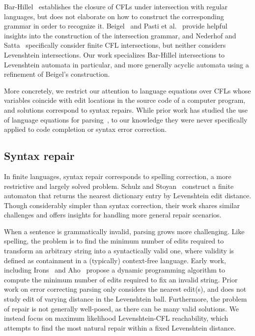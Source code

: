 \documentclass[runningheads]{llncs}
\begin{document}
  Bar-Hillel~\cite{bar1961formal} establishes the closure of CFLs under intersection with regular languages, but does not elaborate on how to construct the corresponding grammar in order to recognize it. Beigel~\cite{beigelproof} and Pasti et al.~\cite{pasti2023intersection} provide helpful insights into the construction of the intersection grammar, and Nederhof and Satta~\cite{nederhof2004language} specifically consider finite CFL intersections, but neither considers Levenshtein intersections. Our work specializes Bar-Hillel intersections to Levenshtein automata in particular, and more generally acyclic automata using a refinement of Beigel's construction.

  More concretely, we restrict our attention to language equations over CFLs whose variables coincide with edit locations in the source code of a computer program, and solutions correspond to syntax repairs. While prior work has studied the use of language equations for parsing~\cite{might2011parsing}, to our knowledge they were never specifically applied to code completion or syntax error correction.

  \subsection{Syntax repair}

  In finite languages, syntax repair corresponds to spelling correction, a more restrictive and largely solved problem. Schulz and Stoyan~\cite{schulz2002fast} construct a finite automaton that returns the nearest dictionary entry by Levenshtein edit distance. Though considerably simpler than syntax correction, their work shares similar challenges and offers insights for handling more general repair scenarios.

  When a sentence is grammatically invalid, parsing grows more challenging. Like spelling, the problem is to find the minimum number of edits required to transform an arbitrary string into a syntactically valid one, where validity is defined as containment in a (typically) context-free language. Early work, including Irons~\cite{irons1963error} and Aho~\cite{aho1972minimum} propose a dynamic programming algorithm to compute the minimum number of edits required to fix an invalid string. Prior work on error correcting parsing only considers the nearest edit(s), and does not study edit of varying distance in the Levenshtein ball. Furthermore, the problem of repair is not generally well-posed, as there can be many valid solutions. We instead focus on maximum likelihood Levenshtein-CFL reachability, which attempts to find the most natural repair within a fixed Levenshtein distance.
\end{document}
